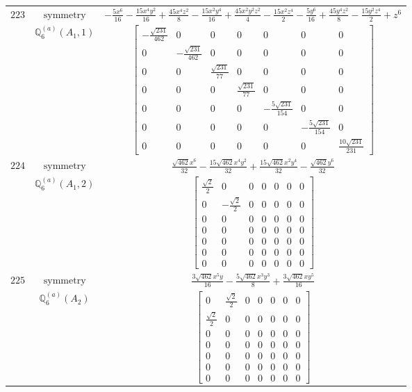 \documentclass[fleqn,8pt,landscape]{jsarticle}
\begin{document}
\begin{longtable}{ccc}
$ 223 $ & $ \text{symmetry} $ & $ - \frac{5 x^{6}}{16} - \frac{15 x^{4} y^{2}}{16} + \frac{45 x^{4} z^{2}}{8} - \frac{15 x^{2} y^{4}}{16} + \frac{45 x^{2} y^{2} z^{2}}{4} - \frac{15 x^{2} z^{4}}{2} - \frac{5 y^{6}}{16} + \frac{45 y^{4} z^{2}}{8} - \frac{15 y^{2} z^{4}}{2} + z^{6} $ \\
$  $ & $ \mathbb{Q}_{6}^{(a)}(A_{1},1) $ & $ \begin{bmatrix} - \frac{\sqrt{231}}{462} & 0 & 0 & 0 & 0 & 0 & 0 \\ 0 & - \frac{\sqrt{231}}{462} & 0 & 0 & 0 & 0 & 0 \\ 0 & 0 & \frac{\sqrt{231}}{77} & 0 & 0 & 0 & 0 \\ 0 & 0 & 0 & \frac{\sqrt{231}}{77} & 0 & 0 & 0 \\ 0 & 0 & 0 & 0 & - \frac{5 \sqrt{231}}{154} & 0 & 0 \\ 0 & 0 & 0 & 0 & 0 & - \frac{5 \sqrt{231}}{154} & 0 \\ 0 & 0 & 0 & 0 & 0 & 0 & \frac{10 \sqrt{231}}{231} \end{bmatrix} $ \\ \hline
$ 224 $ & $ \text{symmetry} $ & $ \frac{\sqrt{462} x^{6}}{32} - \frac{15 \sqrt{462} x^{4} y^{2}}{32} + \frac{15 \sqrt{462} x^{2} y^{4}}{32} - \frac{\sqrt{462} y^{6}}{32} $ \\
$  $ & $ \mathbb{Q}_{6}^{(a)}(A_{1},2) $ & $ \begin{bmatrix} \frac{\sqrt{2}}{2} & 0 & 0 & 0 & 0 & 0 & 0 \\ 0 & - \frac{\sqrt{2}}{2} & 0 & 0 & 0 & 0 & 0 \\ 0 & 0 & 0 & 0 & 0 & 0 & 0 \\ 0 & 0 & 0 & 0 & 0 & 0 & 0 \\ 0 & 0 & 0 & 0 & 0 & 0 & 0 \\ 0 & 0 & 0 & 0 & 0 & 0 & 0 \\ 0 & 0 & 0 & 0 & 0 & 0 & 0 \end{bmatrix} $ \\ \hline
$ 225 $ & $ \text{symmetry} $ & $ \frac{3 \sqrt{462} x^{5} y}{16} - \frac{5 \sqrt{462} x^{3} y^{3}}{8} + \frac{3 \sqrt{462} x y^{5}}{16} $ \\
$  $ & $ \mathbb{Q}_{6}^{(a)}(A_{2}) $ & $ \begin{bmatrix} 0 & \frac{\sqrt{2}}{2} & 0 & 0 & 0 & 0 & 0 \\ \frac{\sqrt{2}}{2} & 0 & 0 & 0 & 0 & 0 & 0 \\ 0 & 0 & 0 & 0 & 0 & 0 & 0 \\ 0 & 0 & 0 & 0 & 0 & 0 & 0 \\ 0 & 0 & 0 & 0 & 0 & 0 & 0 \\ 0 & 0 & 0 & 0 & 0 & 0 & 0 \\ 0 & 0 & 0 & 0 & 0 & 0 & 0 \end{bmatrix} $ \\ \hline

\end{longtable}
\end{document}
